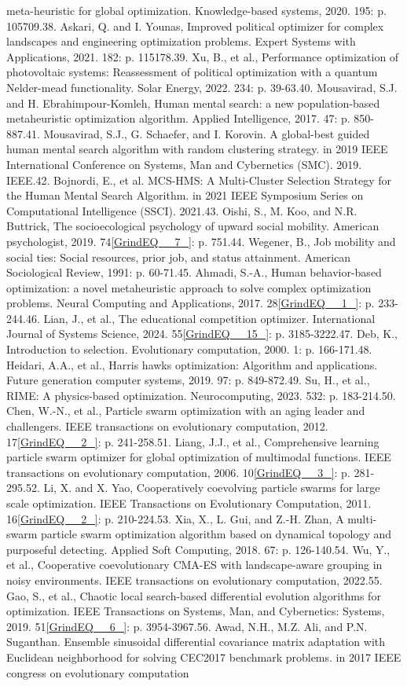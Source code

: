 \documentclass{article} %
\begin{document}
meta-heuristic for global optimization. Knowledge-based systems, 2020. 195: p. 105709.38. Askari, Q. and I. Younas, Improved political optimizer for complex landscapes and engineering optimization problems. Expert Systems with Applications, 2021. 182: p. 115178.39. Xu, B., et al., Performance optimization of photovoltaic systems: Reassessment of political optimization with a quantum Nelder-mead functionality. Solar Energy, 2022. 234: p. 39-63.40. Mousavirad, S.J. and H. Ebrahimpour-Komleh, Human mental search: a new population-based metaheuristic optimization algorithm. Applied Intelligence, 2017. 47: p. 850-887.41. Mousavirad, S.J., G. Schaefer, and I. Korovin. A global-best guided human mental search algorithm with random clustering strategy. in 2019 IEEE International Conference on Systems, Man and Cybernetics (SMC). 2019. IEEE.42. Bojnordi, E., et al. MCS-HMS: A Multi-Cluster Selection Strategy for the Human Mental Search Algorithm. in 2021 IEEE Symposium Series on Computational Intelligence (SSCI). 2021.43. Oishi, S., M. Koo, and N.R. Buttrick, The socioecological psychology of upward social mobility. American psychologist, 2019. 74\eqref{GrindEQ__7_}: p. 751.44. Wegener, B., Job mobility and social ties: Social resources, prior job, and status attainment. American Sociological Review, 1991: p. 60-71.45. Ahmadi, S.-A., Human behavior-based optimization: a novel metaheuristic approach to solve complex optimization problems. Neural Computing and Applications, 2017. 28\eqref{GrindEQ__1_}: p. 233-244.46. Lian, J., et al., The educational competition optimizer. International Journal of Systems Science, 2024. 55\eqref{GrindEQ__15_}: p. 3185-3222.47. Deb, K., Introduction to selection. Evolutionary computation, 2000. 1: p. 166-171.48. Heidari, A.A., et al., Harris hawks optimization: Algorithm and applications. Future generation computer systems, 2019. 97: p. 849-872.49. Su, H., et al., RIME: A physics-based optimization. Neurocomputing, 2023. 532: p. 183-214.50. Chen, W.-N., et al., Particle swarm optimization with an aging leader and challengers. IEEE transactions on evolutionary computation, 2012. 17\eqref{GrindEQ__2_}: p. 241-258.51. Liang, J.J., et al., Comprehensive learning particle swarm optimizer for global optimization of multimodal functions. IEEE transactions on evolutionary computation, 2006. 10\eqref{GrindEQ__3_}: p. 281-295.52. Li, X. and X. Yao, Cooperatively coevolving particle swarms for large scale optimization. IEEE Transactions on Evolutionary Computation, 2011. 16\eqref{GrindEQ__2_}: p. 210-224.53. Xia, X., L. Gui, and Z.-H. Zhan, A multi-swarm particle swarm optimization algorithm based on dynamical topology and purposeful detecting. Applied Soft Computing, 2018. 67: p. 126-140.54. Wu, Y., et al., Cooperative coevolutionary CMA-ES with landscape-aware grouping in noisy environments. IEEE transactions on evolutionary computation, 2022.55. Gao, S., et al., Chaotic local search-based differential evolution algorithms for optimization. IEEE Transactions on Systems, Man, and Cybernetics: Systems, 2019. 51\eqref{GrindEQ__6_}: p. 3954-3967.56. Awad, N.H., M.Z. Ali, and P.N. Suganthan. Ensemble sinusoidal differential covariance matrix adaptation with Euclidean neighborhood for solving CEC2017 benchmark problems. in 2017 IEEE congress on evolutionary computation 
\end{document}

